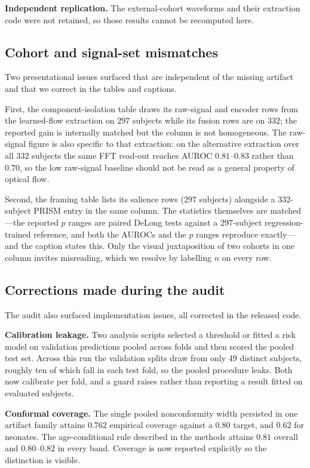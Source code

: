 \textbf{Independent replication.} The external-cohort waveforms and their extraction code were not
retained, so those results cannot be recomputed here.

\subsection{Cohort and signal-set mismatches}
Two presentational issues surfaced that are independent of the missing artifact and that we correct in
the tables and captions.

First, the component-isolation table draws its raw-signal and encoder rows from the learned-flow
extraction on $297$ subjects while its fusion rows are on $332$; the reported gain is internally matched
but the column is not homogeneous. The raw-signal figure is also specific to that extraction: on the
alternative extraction over all $332$ subjects the same FFT read-out reaches AUROC $0.81$--$0.83$ rather
than $0.70$, so the low raw-signal baseline should not be read as a general property of optical flow.

Second, the framing table lists its salience rows ($297$ subjects) alongside a $332$-subject PRISM entry
in the same column. The statistics themselves are matched---the reported $p$ ranges are paired DeLong
tests against a $297$-subject regression-trained reference, and both the AUROCs and the $p$ ranges
reproduce exactly---and the caption states this. Only the visual juxtaposition of two cohorts in one
column invites misreading, which we resolve by labelling $n$ on every row.

\subsection{Corrections made during the audit}
The audit also surfaced implementation issues, all corrected in the released code.

\textbf{Calibration leakage.} Two analysis scripts selected a threshold or fitted a risk model on
validation predictions pooled across folds and then scored the pooled test set. Across this run the
validation splits draw from only $49$ distinct subjects, roughly ten of which fall in each test fold, so
the pooled procedure leaks. Both now calibrate per fold, and a guard raises rather than reporting a
result fitted on evaluated subjects.

\textbf{Conformal coverage.} The single pooled nonconformity width persisted in one artifact family
attains $0.762$ empirical coverage against a $0.80$ target, and $0.62$ for neonates. The age-conditional
rule described in the methods attains $0.81$ overall and $0.80$--$0.82$ in every band. Coverage is now
reported explicitly so the distinction is visible.

